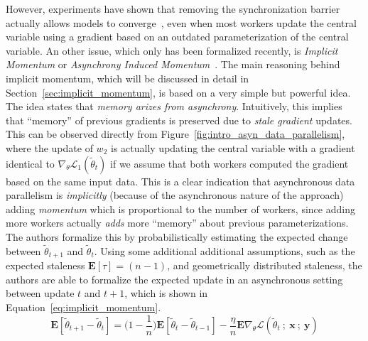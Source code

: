 However, experiments have shown that removing the synchronization barrier actually allows models to converge~\cite{dean2012large, zhang2015deep, hadjis2016omnivore}, even when most workers update the central variable using a gradient based on an outdated parameterization of the central variable. An other issue, which only has been formalized recently, is \emph{Implicit Momentum} or \emph{Asynchrony Induced Momentum}~\cite{implicitmomentum}. The main reasoning behind implicit momentum, which will be discussed in detail in Section~\ref{sec:implicit_momentum}, is based on a very simple but powerful idea. The idea states that \emph{memory arizes from asynchrony}. Intuitively, this implies that ``memory'' of previous gradients is preserved due to \emph{stale gradient} updates. This can be observed directly from Figure~\ref{fig:intro_asyn_data_parallelism}, where the update of $w_2$ is actually updating the central variable with a gradient identical to $\nabla_\theta \mathcal{L}_1(\tilde{\theta}_t)$ if we assume that both workers computed the gradient based on the same input data. This is a clear indication that asynchronous data parallelism is \emph{implicitly} (because of the asynchronous nature of the approach) adding \emph{momentum} which is proportional to the number of workers, since adding more workers actually \emph{adds} more ``memory'' about previous parameterizations. The authors formalize this by probabilistically estimating the expected change between $\tilde{\theta}_{t+1}$ and $\tilde{\theta}_t$. Using some additional additional assumptions, such as the expected staleness $\mathbf{E}[\tau] = (n - 1)$, and geometrically distributed staleness, the authors are able to formalize the expected update in an asynchronous setting between update $t$ and $t + 1$, which is shown in Equation~\ref{eq:implicit_momentum}.\\

\begin{equation}
  \label{eq:implicit_momentum}
  \mathbf{E}[\tilde{\theta}_{t+1} - \tilde{\theta}_t] = \Bigg( 1 - \frac{1}{n} \Bigg) \mathbf{E}[\tilde{\theta}_t - \tilde{\theta}_{t-1}] - \frac{\eta}{n} \mathbf{E} \nabla_\theta \mathcal{L}(\tilde{\theta}_t~;~\textbf{x}~;~\textbf{y})
\end{equation}


